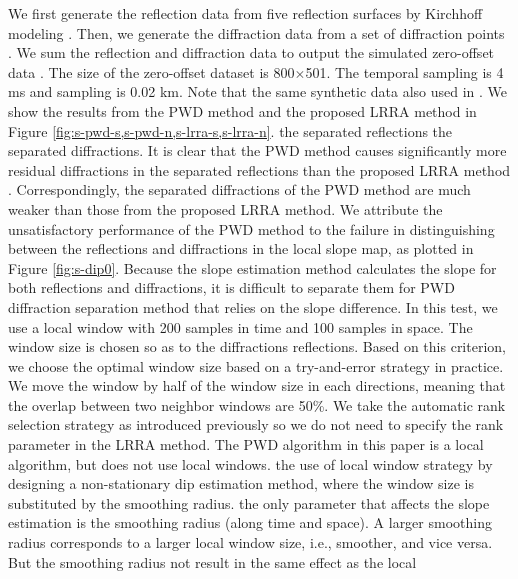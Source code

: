  We first generate the reflection data from five reflection surfaces by Kirchhoff modeling . Then, we generate the diffraction data from a set of diffraction points . We sum the reflection and diffraction data to output the simulated zero-offset data . The size of the zero-offset dataset is 800$\times$501. The temporal sampling is 4 ms and  sampling is 0.02 km. Note that the same synthetic data  also used in \cite{merzlikin2019least}. We show the results from the PWD method \cite[]{fomel2007} and the proposed LRRA method in Figure \ref{fig:s-pwd-s,s-pwd-n,s-lrra-s,s-lrra-n}.  the separated reflections the separated diffractions. It is clear that the PWD method  causes significantly more residual diffractions in the separated reflections than the proposed LRRA method . Correspondingly, the separated diffractions of the PWD method are much weaker than those from the proposed LRRA method. We attribute the unsatisfactory performance of the PWD method to the failure in distinguishing between the reflections and diffractions in the local slope map, as plotted in Figure \ref{fig:s-dip0}. Because the slope estimation method calculates the slope for both reflections and diffractions, it is difficult to separate them for PWD diffraction separation method that relies on the slope difference. In this test, we use a local window with 200 samples in time and 100 samples in space. The window size is chosen so as to  the  diffractions reflections. Based on this criterion, we choose the optimal window size based on a try-and-error strategy in practice. We move the window by half of the window size in each directions, meaning that the overlap between two neighbor windows are 50\%. We take the automatic rank selection strategy as introduced previously so we do not need to specify the rank parameter in the LRRA method. The PWD algorithm \cite{fomel2002pwd} in this paper is a local algorithm, but does not use local windows. \cite{fomel2002pwd}  the use of local window strategy by designing a non-stationary dip estimation method, where the window size is substituted by the smoothing radius.  the only parameter that affects the slope estimation is the smoothing radius (along time and space). A larger smoothing radius corresponds to a larger local window size, i.e., smoother, and vice versa. But the smoothing radius  not result in the same effect as the local 